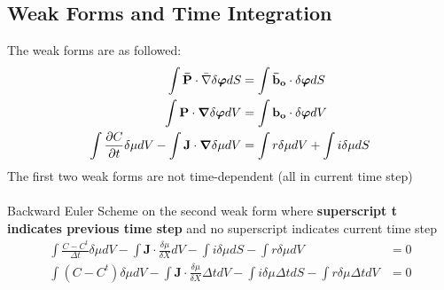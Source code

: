 \documentclass[12pt,3p]{article}
\numberwithin{equation}{section}
\begin{document}
\subsection{Weak Forms and Time Integration}
The weak forms are as followed: 
\begin{align*}
\int \mathbf{\bar{P}} \cdot \bar{\nabla} \delta \boldsymbol\varphi dS  &= \int \mathbf{\bar{b}_o} \cdot \delta \boldsymbol\varphi dS \\
\int \mathbf{P} \cdot \grad \delta \boldsymbol\varphi dV &= \int \mathbf{b_o} \cdot \delta \boldsymbol\varphi dV \\
\int \pdv{C}{t} \delta \mu dV - \int \mathbf{J} \cdot \grad \delta \mu dV &= \int r \delta \mu dV + \int i \delta \mu dS 
\end{align*}
The first two weak forms are not time-dependent (all in current time step) \\ \\
Backward Euler Scheme on the second weak form where \textbf{superscript t indicates previous time step} and no superscript indicates current time step
\begin{align*}
\int \frac{C - C^t}{\Delta t} \delta \mu dV - \int \mathbf{J} \cdot \frac{\delta \mu}{\delta X} dV - \int i \delta \mu dS - \int r \delta \mu dV &= 0 \\
\int (C - C^t) \delta \mu dV - \int \mathbf{J} \cdot \frac{\delta \mu}{\delta X} \Delta t dV - \int i \delta \mu \Delta t dS - \int r \delta \mu \Delta t dV &= 0 
\end{align*}

\end{document}
